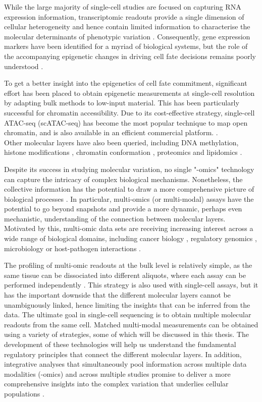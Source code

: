 While the large majority of single-cell studies are focused on capturing RNA expression information, transcriptomic readouts provide a single dimension of cellular heterogeneity and hence contain limited information to characterise the molecular determinants of phenotypic variation \cite{Ritchie2015}. Consequently, gene expression markers have been identified for a myriad of biological systems, but the role of the accompanying epigenetic changes in driving cell fate decisions remains poorly understood \cite{Griffiths2018,Kelsey2017,Bheda2014}.

To get a better insight into the epigenetics of cell fate commitment, significant effort has been placed to obtain epigenetic measurements at single-cell resolution by adapting bulk methods to low-input material. This has been particularly successful for chromatin accessibility. Due to its cost-effective strategy, single-cell ATAC-seq (scATAC-seq) has become the most popular technique to map open chromatin, and is also available in an efficient commercial platform. \cite{Cusanovich2015,Cao2018,Chen2018}.\\
Other molecular layers have also been queried, including DNA methylation\cite{Smallwood2014}, histone modifications \cite{Ku2019}, chromatin conformation \cite{Ku2019}, proteomics \cite{Specht2018} and lipidomics \cite{Thiele2019}.

Despite its success in studying molecular variation, no single "-omics" technology can capture the intricacy of complex biological mechanisms. Nonetheless, the collective information has the potential to draw a more comprehensive picture of biological processes \cite{Hasin2017,Ritchie2015}. In particular, multi-omics (or multi-modal) assays have the potential to go beyond snapshots and provide a more dynamic, perhaps even mechanistic, understanding of the connection between molecular layers. Motivated by this, multi-omic data sets are receiving increasing interest across a wide range of biological domains, including cancer biology \cite{Akavia2010,Gerstung2015}, regulatory genomics \cite{Chen2016}, microbiology \cite{Kim2016} or host-pathogen interactions \cite{Soderholm2016}. 

The profiling of multi-omic readouts at the bulk level is relatively simple, as the same tissue can be dissociated into different aliquots, where each assay can be performed independently \cite{Ritchie2015}. This strategy is also used with single-cell assays, but it has the important downside that the different molecular layers cannot be unambiguously linked, hence limiting the insights that can be inferred from the data. The ultimate goal in single-cell sequencing is to obtain multiple molecular readouts from the same cell. Matched multi-modal measurements can be obtained using a variety of strategies, some of which will be discussed in this thesis. The development of these technologies will help us understand the fundamental regulatory principles that connect the different molecular layers. In addition, integrative analyses that simultaneously pool information across multiple data modalities (-omics) and across multiple studies promise to deliver a more comprehensive insights into the complex variation that underlies cellular populations \cite{Stuart2019,Colome-Tatche2018}.

